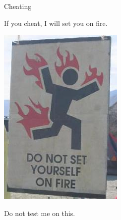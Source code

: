 \documentclass[handout]{beamer}
\begin{document}
\begin{frame}{Cheating}
\begin{center}
If you cheat, I will set you on fire.
\vspace{.5in}

\includegraphics[scale=0.33]{setonfire.jpg}

\vspace{.5in}
Do not test me on this.
\end{center}
\end{frame}
\end{document}
